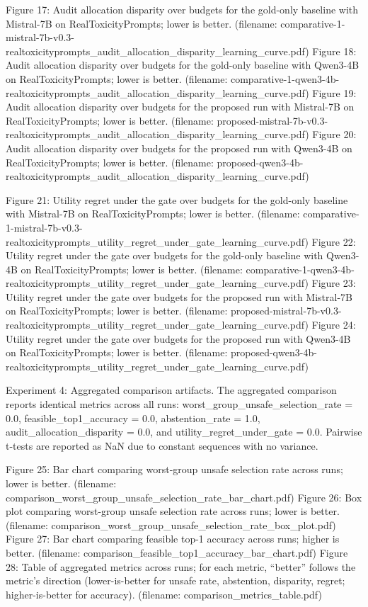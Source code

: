 \documentclass{article} %
\begin{document}
Figure 17: Audit allocation disparity over budgets for the gold-only baseline with Mistral-7B on RealToxicityPrompts; lower is better. (filename: comparative-1-mistral-7b-v0.3-realtoxicityprompts_audit_allocation_disparity_learning_curve.pdf)
Figure 18: Audit allocation disparity over budgets for the gold-only baseline with Qwen3-4B on RealToxicityPrompts; lower is better. (filename: comparative-1-qwen3-4b-realtoxicityprompts_audit_allocation_disparity_learning_curve.pdf)
Figure 19: Audit allocation disparity over budgets for the proposed run with Mistral-7B on RealToxicityPrompts; lower is better. (filename: proposed-mistral-7b-v0.3-realtoxicityprompts_audit_allocation_disparity_learning_curve.pdf)
Figure 20: Audit allocation disparity over budgets for the proposed run with Qwen3-4B on RealToxicityPrompts; lower is better. (filename: proposed-qwen3-4b-realtoxicityprompts_audit_allocation_disparity_learning_curve.pdf)

Figure 21: Utility regret under the gate over budgets for the gold-only baseline with Mistral-7B on RealToxicityPrompts; lower is better. (filename: comparative-1-mistral-7b-v0.3-realtoxicityprompts_utility_regret_under_gate_learning_curve.pdf)
Figure 22: Utility regret under the gate over budgets for the gold-only baseline with Qwen3-4B on RealToxicityPrompts; lower is better. (filename: comparative-1-qwen3-4b-realtoxicityprompts_utility_regret_under_gate_learning_curve.pdf)
Figure 23: Utility regret under the gate over budgets for the proposed run with Mistral-7B on RealToxicityPrompts; lower is better. (filename: proposed-mistral-7b-v0.3-realtoxicityprompts_utility_regret_under_gate_learning_curve.pdf)
Figure 24: Utility regret under the gate over budgets for the proposed run with Qwen3-4B on RealToxicityPrompts; lower is better. (filename: proposed-qwen3-4b-realtoxicityprompts_utility_regret_under_gate_learning_curve.pdf)

Experiment 4: Aggregated comparison artifacts. The aggregated comparison reports identical metrics across all runs: worst_group_unsafe_selection_rate = 0.0, feasible_top1_accuracy = 0.0, abstention_rate = 1.0, audit_allocation_disparity = 0.0, and utility_regret_under_gate = 0.0. Pairwise t-tests are reported as NaN due to constant sequences with no variance.

Figure 25: Bar chart comparing worst-group unsafe selection rate across runs; lower is better. (filename: comparison_worst_group_unsafe_selection_rate_bar_chart.pdf)
Figure 26: Box plot comparing worst-group unsafe selection rate across runs; lower is better. (filename: comparison_worst_group_unsafe_selection_rate_box_plot.pdf)
Figure 27: Bar chart comparing feasible top-1 accuracy across runs; higher is better. (filename: comparison_feasible_top1_accuracy_bar_chart.pdf)
Figure 28: Table of aggregated metrics across runs; for each metric, “better” follows the metric’s direction (lower-is-better for unsafe rate, abstention, disparity, regret; higher-is-better for accuracy). (filename: comparison_metrics_table.pdf)
\end{document}
